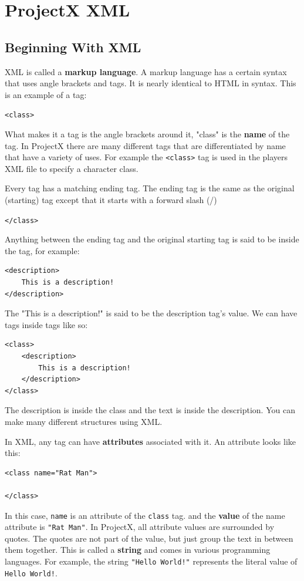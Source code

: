 \documentclass{book}
\begin{document}
	\chapter{ProjectX XML}
	\section{Beginning With XML}
	XML is called a \textbf{markup language}. A markup language has a certain syntax that uses angle brackets and tags. It is nearly identical to HTML in syntax. This is an example of a tag:
	
	\begin{center}
		\texttt{<class>}
	\end{center}
	
	What makes it a tag is the angle brackets around it, "class" is the \textbf{name} of the tag. In ProjectX there are many different tags that are differentiated by name that have a variety of uses. For example the \texttt{<class>} tag is used in the players XML file to specify a character class.
	
	Every tag has a matching ending tag. The ending tag is the same as the original (starting) tag except that it starts with a forward slash (/)

	\begin{center}
		\texttt{</class>}
	\end{center}
	
	Anything between the ending tag and the original starting tag is said to be inside the tag, for example:
	\begin{verbatim}
<description>
	This is a description!
</description>
	\end{verbatim}
	The "This is a description!" is said to be the description tag's value. We can have tags inside tags like so:
	\begin{verbatim}
<class>
	<description>
		This is a description!
	</description>
</class>
	\end{verbatim}
	The description is inside the class and the text is inside the description. You can make many different structures using XML.
	
	In XML, any tag can have \textbf{attributes} associated with it. An attribute looks like this:
	\begin{verbatim}
<class name="Rat Man">
	
</class>
	\end{verbatim}
	In this case, \texttt{name} is an attribute of the \texttt{class} tag. and the \textbf{value} of the name attribute is \texttt{"Rat Man"}. In ProjectX, all attribute values are surrounded by quotes. The quotes are not part of the value, but just group the text in between them together. This is called a \textbf{string} and comes in various programming languages. For example, the string \texttt{"Hello World!"} represents the literal value of \texttt{Hello World!}.
	
\end{document}
